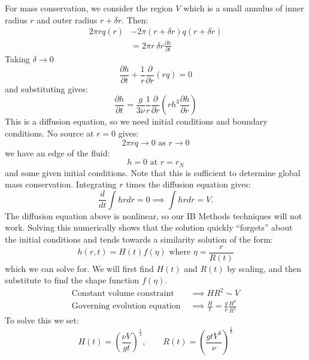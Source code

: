 \documentclass[../Main.tex]{subfiles}
\begin{document}
For mass conservation, we consider the region $V$ which is a small annulus of inner radius $r$ and outer radius $r + \delta r$. Then:
\begin{align*}
    2\pi r q(r) &-2\pi (r + \delta r) q(r + \delta r) \\
    &= 2\pi r~\delta r \frac{\partial h}{\partial t}
\end{align*}
Taking $\delta \to 0$
\begin{equation*}
    \frac{\partial h}{\partial t} + \frac{1}{r} \frac{\partial}{\partial r} \left(rq\right) = 0
\end{equation*}
and substituting gives:
\begin{equation*}
    \frac{\partial h}{\partial t} = \frac{g}{3\nu} \frac1r \frac{\partial }{\partial r} \left(r h^3 \frac{\partial h}{\partial r}\right)
\end{equation*}
This is a diffusion equation, so we need initial conditions and boundary conditions. No source at $r = 0$ gives:
\begin{equation*}
    2\pi r q \to 0 \text{ as } r \to 0
\end{equation*}
we have an edge of the fluid:
\begin{equation*}
    h = 0 \text{ at } r = r_N
\end{equation*}
and some given initial conditions. Note that this is sufficient to determine global mass conservation. Integrating $r$ times the diffusion equation gives:
\begin{equation*}
    \frac{d}{dt}\int h r dr = 0\implies \int h r dr = V.
\end{equation*}
The diffusion equation above is nonlinear, so our IB Methods techniques will not work. Solving this numerically shows that the solution quickly ``forgets'' about the initial conditions and tends towards a similarity solution of the form:
\begin{equation*}
    h(r, t) = H(t) f(\eta) \text{ where } \eta = \frac{r}{R(t)}
\end{equation*}
which we can solve for. We will first find $H(t)$ and $R(t)$ by scaling, and then substitute to find the shape function $f(\eta)$.
\begin{align*}
    \text{Constant volume constraint }&\implies HR^2 \sim V \\
    \text{Governing evolution equation }&\implies \frac{H}{t} = \frac{g}{\nu} \frac{H^4}{R^2}
\end{align*}
To solve this we set:
\begin{equation*}
    H(t) = \left(\frac{\nu V}{gt}\right)^{\frac14},\qquad R(t) = \left(\frac{gtV^3}{\nu}\right)^\frac18
\end{equation*}
\end{document}
